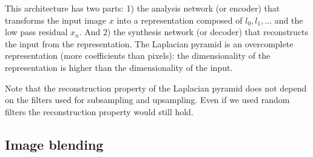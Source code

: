 This architecture has two parts: 1) the analysis network (or encoder) that transforms the input image $x$ into a representation composed of $l_0, l_1, ...$ and the low pass residual $x_n$. And 2) the synthesis network (or decoder) that reconstructs the input from the representation.  The Laplacian pyramid is an overcomplete representation (more coefficients than pixels): the dimensionality of the representation is higher than the dimensionality of the input.

Note that the reconstruction property of the Laplacian pyramid does not depend on the filters used for subsampling and upsampling. Even if we used random filters the reconstruction property would still hold. 

\subsection{Image blending}

